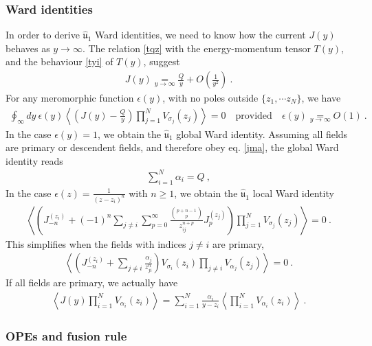 \documentclass[12pt, a4paper, notitlepage, twoside]{report}
\numberwithin{equation}{section}
\theoremstyle{break}
\begin{document}
\subsubsection{Ward identities}

In order to derive $\hat{\mathfrak{u}}_1$ Ward identities, we need to know how the current $J(y)$ behaves as $y\to \infty$.
The relation \eqref{tqz} with the energy-momentum tensor $T(y)$, and the behaviour \eqref{tyi} of $T(y)$, suggest
\begin{align}
 \boxed{J(y) \underset{y\to \infty}{=} \frac{Q}{y} + O\left(\frac{1}{y^2}\right)}\ .
\label{jyi}
\end{align}
For any meromorphic function $\epsilon(y)$, with no poles outside $\{z_1,\cdots z_N\}$, we have 
\begin{align}
 \oint_\infty dy\ \epsilon(y) \left\langle \left(J(y)-\frac{Q}{y}\right)\prod_{j=1}^N V_{\sigma_j}(z_j)\right\rangle = 0   \quad \text{provided} \quad \epsilon(y) \underset{y\to\infty}{=} O(1)\ .
\end{align}
In the case $\epsilon(y)=1$, we obtain the $\hat{\mathfrak{u}}_1$ global Ward identity.
Assuming all fields are primary or descendent fields, and therefore obey eq. \eqref{jma}, the global Ward identity reads
\begin{align}
 \boxed{\sum_{i=1}^N \alpha_i = Q} \ ,
\label{saq}
\end{align}
In the case $\epsilon(z) = \frac{1}{(z-z_i)^{n}}$ with $n\geq 1$, we obtain the $\hat{\mathfrak{u}}_1$ local Ward identity
\begin{align}
\left\langle \left(J_{-n}^{(z_i)}+ (-1)^{n}\sum_{j\neq i}\sum_{p=0}^\infty \frac{\binom{p+n-1}{p}}{z_{ij}^{n+p}}  J_p^{(z_j)}\right)\prod_{j=1}^N V_{\sigma_j}(z_j) \right\rangle = 0\ .
\label{jnjp}
\end{align}
This simplifies when the fields with indices $j\neq i$ are primary, 
\begin{align}
 \left\langle \left(J_{-n}^{(z_i)}  + \sum_{j\neq i} \frac{\alpha_j}{z_{ji}^n}\right) V_{\sigma_i}(z_i)\prod_{j\neq i} V_{\alpha_j}(z_j)\right\rangle= 0\ .
\label{jnz}
\end{align}
If all fields are primary, we actually have 
\begin{align}
 \boxed{\left\langle J(y) \prod_{i=1}^N V_{\alpha_i}(z_i) \right\rangle = \sum_{i=1}^N \frac{\alpha_i}{y-z_i} \left\langle \prod_{i=1}^N V_{\alpha_i}(z_i) \right\rangle  }\ .
\label{jsa}
\end{align}

\subsubsection{OPEs and fusion rule}
\end{document}
